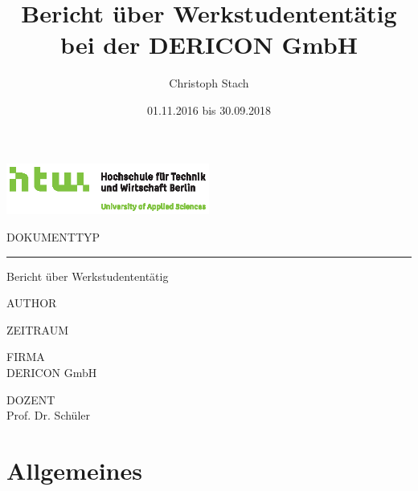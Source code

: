 \documentclass[chapterprefix=false, 12pt, a4paper, oneside, parskip=half, listof=totoc, bibliography=totoc, numbers=noendperiod]{scrbook}
\title{Bericht über Werkstudententätig bei der DERICON GmbH}
\author{Christoph Stach}
\date{01.11.2016 bis 30.09.2018}
\begin{document}
    \begin{titlepage}
        \includegraphics[width=0.50\textwidth]{img/Q01_HTW_Berlin_Logo_quer_pos_FARBIG_CMYK.eps}

        \vspace{4.0cm}

        \begin{changemargin}{0.5cm}{0.0cm}
        \color{htwgrau}
        \normalsize
        \textsf{\noindent\MakeUppercase{Dokumenttyp}} \vspace{-20pt}\\
        \noindent\rule{\textwidth}{0.5pt}\vspace{-4pt}
        \color{black}
        \huge
        \textsf{Bericht über Werkstudententätig}
        \vspace{12pt}

        \color{htwgrau}
        \normalsize
        \textsf{\MakeUppercase{Author}}\\
        \color{black}
        \large
        \textsf{\theauthor}

        \color{htwgrau}
        \normalsize
        \textsf{\MakeUppercase{Zeitraum}}\\
        \color{black}
        \large
        \textsf{\thedate}

        \vfill

        \color{htwgrau}
        \normalsize
        \textsf{\MakeUppercase{Firma}}\\
        \color{black}
        \large
        \textsf{DERICON GmbH}

        \color{htwgrau}
        \normalsize
        \textsf{\MakeUppercase{Dozent}}\\
        \color{black}
        \large
        \textsf{Prof. Dr. Schüler}
        \vspace{-60pt}
        \end{changemargin}
    \end{titlepage}

    \tableofcontents

    \chapter{Allgemeines}
\end{document}
